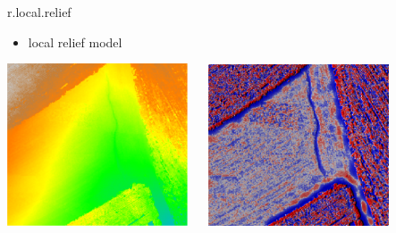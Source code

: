 \documentclass[xcolor={dvipsnames,usenames},beamer,aspectratio=169]{beamer}
\begin{document}
\begin{frame}{r.local.relief}

\begin{itemize}
  \item local relief model
\end{itemize}

\begin{center}
  \includegraphics[width=0.4\textwidth]{vis/elevation}
  ~~
  \includegraphics[width=0.4\textwidth]{vis/lrm}
\end{center}

\end{frame}
\end{document}
